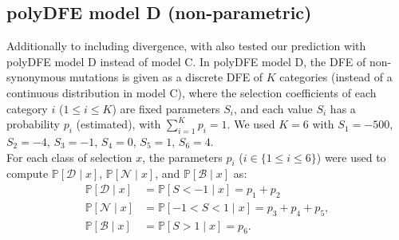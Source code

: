 \documentclass{article}
\newcommand{\proba}{\mathbb{P}}
\newcommand{\Sphyclass}{x}
\newcommand{\given}{\mid}
\newcommand{\Spop}{S}
\newcommand{\SpopDel}{\mathcal{D}}
\newcommand{\SpopNeu}{\mathcal{N}}
\newcommand{\SpopBen}{\mathcal{B}}
\begin{document}
    \subsection{polyDFE model D (non-parametric)}
    Additionally to including divergence, with also tested our prediction with polyDFE model D instead of model C.
    In polyDFE model D, the DFE of non-synonymous mutations is given as a discrete DFE of $K$ categories (instead of a continuous distribution in model C), where the selection coefficients of each category $i$ ($1 \leq i \leq K$) are fixed parameters $\Spop_i$, and each value $\Spop_i$ has a probability $p_i$ (estimated), with $\sum_{i=1}^{K} p_i =1$.
    We used $K=6$ with $\Spop_1 = -500$, $\Spop_2 = -4$, $\Spop_3 =-1$, $\Spop_4 = 0$, $\Spop_5 = 1$, $\Spop_6 = 4$.\\
    For each class of selection $\Sphyclass$, the parameters $p_i$ ($i \in \{ 1 \leq i \leq 6 \}$) were used to compute $\proba [ \SpopDel \given  \Sphyclass] $, $\proba [ \SpopNeu \given \Sphyclass]$, and $\proba [ \SpopBen \given \Sphyclass]$ as:
    \begin{align}
        \proba [ \SpopDel \given  \Sphyclass] &= \proba [ \Spop < -1 \given \Sphyclass ] = p_1 + p_2 \label{eq:polyProbaDel-mD} \\
        \proba [ \SpopNeu \given \Sphyclass] &= \proba [ -1 < \Spop < 1 \given \Sphyclass ] = p_3 + p_4 + p_5,  \\
        \proba [ \SpopBen \given \Sphyclass] &= \proba [  \Spop > 1 \given \Sphyclass ] = p_6.  \label{eq:polyProbaAdv-mD}
    \end{align}
\end{document}
